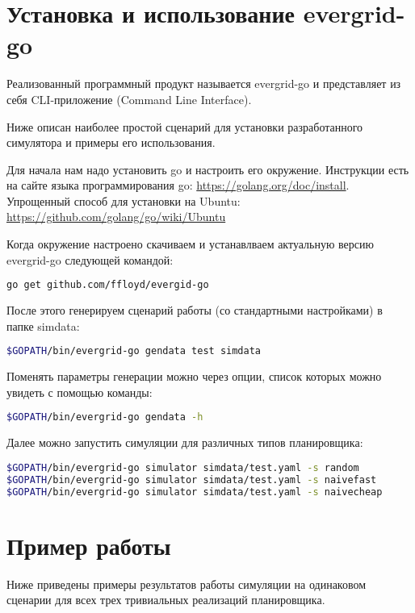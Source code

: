 \section{Установка и использование evergrid-go}

Реализованный программный продукт называется evergrid-go и представляет из себя CLI-приложение (Command Line Interface).

Ниже описан наиболее простой сценарий для установки разработанного симулятора и примеры его использования.

Для начала нам надо установить go и настроить его окружение. Инструкции есть на сайте языка программирования go: \url{https://golang.org/doc/install}. Упрощенный способ для установки на Ubuntu: \url{https://github.com/golang/go/wiki/Ubuntu}

Когда окружение настроено скачиваем и устанавлваем актуальную версию evergrid-go следующей командой:

\begin{lstlisting}[language=bash]
go get github.com/ffloyd/evergid-go
\end{lstlisting}

После этого генерируем сценарий работы (со стандартными настройками) в папке simdata:

\begin{lstlisting}[language=bash]
$GOPATH/bin/evergrid-go gendata test simdata
\end{lstlisting}

Поменять параметры генерации можно через опции, список которых можно увидеть с помощью команды:

\begin{lstlisting}[language=bash]
$GOPATH/bin/evergrid-go gendata -h
\end{lstlisting}

Далее можно запустить симуляции для различных типов планировщика:

\begin{lstlisting}[language=bash]
$GOPATH/bin/evergrid-go simulator simdata/test.yaml -s random
$GOPATH/bin/evergrid-go simulator simdata/test.yaml -s naivefast
$GOPATH/bin/evergrid-go simulator simdata/test.yaml -s naivecheap
\end{lstlisting}

\section{Пример работы}

Ниже приведены примеры результатов работы симуляции на одинаковом сценарии для всех трех тривиальных реализаций планировщика.

